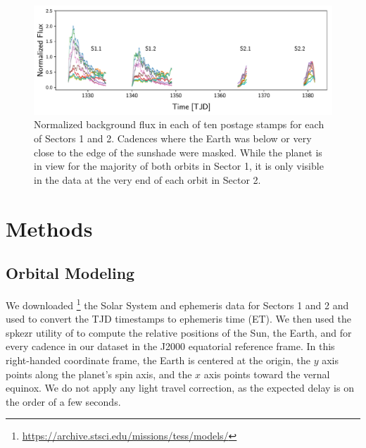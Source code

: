 \documentclass[modern]{aastex62}
\begin{document}
\begin{figure}[t!]
    \begin{centering}
    \includegraphics[width=\linewidth]{figures/data.pdf}
    \caption{\label{fig:data}
             Normalized background flux in each of ten postage stamps
             for each of Sectors 1 and 2. Cadences where the Earth was
             below or very close to the edge of the sunshade were masked.
             While the planet is in view for the majority of both orbits
             in Sector 1, it is only visible in the data at the very end
             of each orbit in Sector 2.
             }
    \end{centering}
\end{figure}

\section{Methods}%
\label{sec:methods}%
%
\subsection{Orbital Modeling}%
\label{sec:orbit}%
%
We downloaded%
\footnote{\url{https://archive.stsci.edu/missions/tess/models/}}
the Solar System and \TESS ephemeris data for
Sectors 1 and 2 and used \spiceypy \citep{Acton1996, Acton2017, Annex2017}
to convert the TJD timestamps to 
ephemeris time (ET). We then used the \textsf{spkezr} utility of \spiceypy to compute
the relative positions of the Sun, the Earth, and \TESS for every cadence
in our dataset in the J2000 equatorial reference frame. In this right-handed
coordinate frame, the Earth is centered at the origin, the $y$ axis points along the 
planet's spin axis, and the $x$ axis points toward the vernal equinox. We
do not apply any light travel correction, as the expected delay is on the order
of a few seconds.
\end{document}
